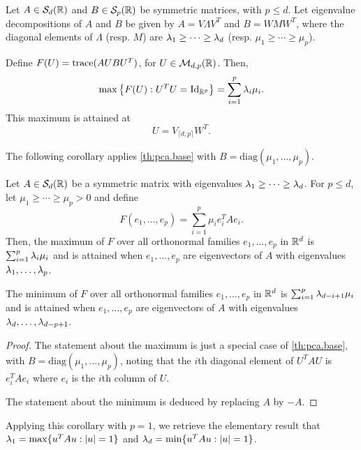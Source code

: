 \begin{theorem}
\label{th:pca.base}
Let $A\in {\mathcal S}_{d}({\mathbb{R}})$ and $B\in {\mathcal S}_{p}({\mathbb{R}})$ be   symmetric matrices,  with $p\leq d$. Let  eigenvalue decompositions of $A$ and $B$ be  given by $A = V\Lambda V^T$ and  $B= WMW^T$, where the diagonal elements of  $\Lambda$ (resp. $M$) are  $\lambda_1\geq \cdots \geq \lambda_d$ (resp. $\mu_1  \geq \cdots \geq \mu_p$).

Define $F(U) = {\mathrm{trace}}(AUBU^T)$, for $U\in {\mathcal M}_{d,p}({\mathbb{R}})$. Then,
\[
\max\left\{F(U): U^TU = \Id[p]\right\} = \sum_{i=1}^p \la_i\mu_i.
\]
This maximum is attained at 
\[
U = V_{\lceil d,p\rceil} W^T.
\]
\end{theorem}

The following corollary applies \cref{th:pca.base} with $B = \mathrm{diag}(\mu_1, \ldots, \mu_p)$.
\begin{corollary}
\label{cor:pca.base}
Let $A\in {\mathcal S}_{d}({\mathbb{R}})$ be a symmetric matrix with eigenvalues $\lambda_1\geq \cdots \geq \lambda_d$.
For $p\leq d$, let $\mu_1 \geq  \cdots \geq \mu_p > 0$ and define
\[
F(e_1, \ldots, e_p) = \sum_{i=1}^p \mu_i e_i^TAe_i.
\]
Then, the maximum of $F$ over all orthonormal families $e_1, \ldots, e_p$ in ${\mathbb{R}}^d$ is $\sum_{i=1}^p \lambda_i\mu_i$ and is attained when $e_1, \ldots, e_p$ are eigenvectors of $A$ with eigenvalues $\lambda_1, \ldots, \lambda_p$. 

The minimum of $F$ over all orthonormal families $e_1, \ldots, e_p$ in ${\mathbb{R}}^d$ is $\sum_{i=1}^p \lambda_{d-i+1}\mu_i$ and is attained when $e_1, \ldots, e_p$ are eigenvectors of $A$ with eigenvalues $\lambda_d, \ldots, \lambda_{d-p+1}$. 
\end{corollary}
\begin{proof}
The statement about the maximum is just a special case of  \cref{th:pca.base}, with $B = \mathrm{diag}(\mu_1, \ldots, \mu_p)$, noting that the $i$th diagonal element of $U^TAU$ is $e_i^TAe_i$ where $e_i$ is the $i$th column of $U$.

The  statement about the minimum is deduced by replacing $A$ by $-A$.
\end{proof}
Applying this corollary with $p=1$, we retrieve the elementary result that $\lambda_1 = \max\{u^TAu: |u|=1\}$ and $\lambda_d = \min\{u^TAu: |u|=1\}$. 

\bigskip


